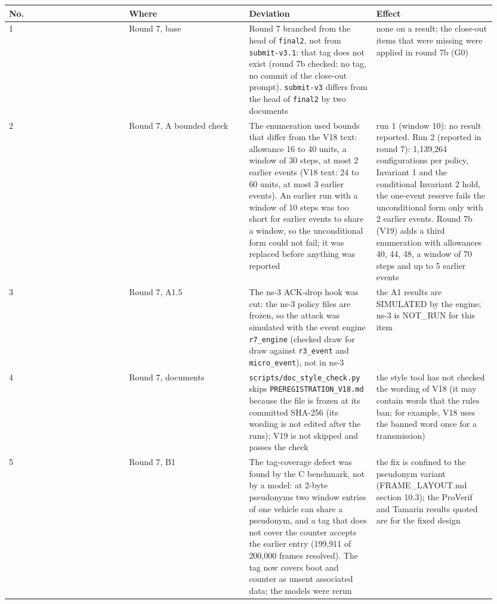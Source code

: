 


{\scriptsize\raggedright
\begin{longtable}{p{0.237\linewidth}p{0.237\linewidth}p{0.237\linewidth}p{0.237\linewidth}}
\toprule
No. & Where & Deviation & Effect \\
\midrule
\endhead
1 & Round 7, base & Round 7 branched from the head of \texttt{final2}, not from \texttt{submit-v3.1}: that tag does not exist (round 7b checked: no tag, no commit of the close-out prompt). \texttt{submit-v3} differs from the head of \texttt{final2} by two documents & none on a result; the close-out items that were missing were applied in round 7b (G0) \\
2 & Round 7, A bounded check & The enumeration used bounds that differ from the V18 text: allowance 16 to 40 units, a window of 30 steps, at most 2 earlier events (V18 text: 24 to 60 units, at most 3 earlier events). An earlier run with a window of 10 steps was too short for earlier events to share a window, so the unconditional form could not fail; it was replaced before anything was reported & run 1 (window 10): no result reported. Run 2 (reported in round 7): 1,139,264 configurations per policy, Invariant 1 and the conditional Invariant 2 hold, the one-event reserve fails the unconditional form only with 2 earlier events. Round 7b (V19) adds a third enumeration with allowances 40, 44, 48, a window of 70 steps and up to 5 earlier events \\
3 & Round 7, A1.5 & The ns-3 ACK-drop hook was cut: the ns-3 policy files are frozen, so the attack was simulated with the event engine \texttt{r7\_engine} (checked draw for draw against \texttt{r3\_event} and \texttt{micro\_event}), not in ns-3 & the A1 results are SIMULATED by the engine; ns-3 is NOT\_RUN for this item \\
4 & Round 7, documents & \texttt{scripts/doc\_style\_check.py} skips \texttt{PREREGISTRATION\_V18.md} because the file is frozen at its committed SHA-256 (its wording is not edited after the runs); V19 is not skipped and passes the check & the style tool has not checked the wording of V18 (it may contain words that the rules ban; for example, V18 uses the banned word once for a transmission) \\
5 & Round 7, B1 & The tag-coverage defect was found by the C benchmark, not by a model: at 2-byte pseudonyms two window entries of one vehicle can share a pseudonym, and a tag that does not cover the counter accepts the earlier entry (199,911 of 200,000 frames resolved). The tag now covers boot and counter as unsent associated data; the models were rerun & the fix is confined to the pseudonym variant (FRAME\_LAYOUT.md section 10.3); the ProVerif and Tamarin results quoted are for the fixed design \\

\end{longtable}}
